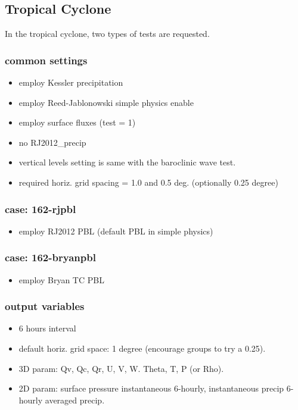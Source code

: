 \documentclass[a4paper]{article}
\begin{document}
\subsection{Tropical Cyclone}
In the tropical cyclone, two types of tests are requested.

\subsubsection{common settings}
 \begin{itemize}
   \item employ Kessler precipitation
   \item employ Reed-Jablonowski simple physics enable
   \item employ surface fluxes (test = 1)
   \item no RJ2012\_precip
   \item vertical levels setting is same with the baroclinic wave test.
   \item required horiz. grid spacing = 1.0 and 0.5 deg.
         (optionally 0.25 degree)
 \end{itemize}

\subsubsection{case: 162-rjpbl}
 \begin{itemize}
   \item employ RJ2012 PBL (default PBL in simple physics)
 \end{itemize}

\subsubsection{case: 162-bryanpbl}
 \begin{itemize}
   \item employ Bryan TC PBL
 \end{itemize}

\subsubsection{output variables}
 \begin{itemize}
   \item 6 hours interval
   \item default horiz. grid space: 1 degree (encourage groups to try a 0.25).
   \item 3D param: Qv, Qc, Qr, U, V, W. Theta, T, P (or Rho).
   \item 2D param: surface pressure instantaneous 6-hourly,
             instantaneous precip 6-hourly averaged precip.
 \end{itemize}
\end{document}
